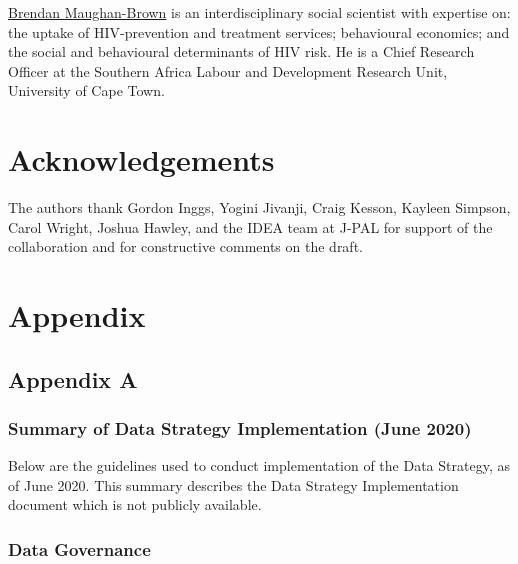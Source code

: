 \href{https://sites.google.com/site/bmaughanbrown/}{Brendan Maughan-Brown} is an interdisciplinary social scientist with expertise on: the uptake of HIV-prevention and treatment services; behavioural economics; and the social and behavioural determinants of HIV risk. He is a Chief Research Officer at the Southern Africa Labour and Development Research Unit, University of Cape Town.

\hypertarget{acknowledgements-3}{%
\section*{Acknowledgements}\label{acknowledgements-3}}

The authors thank Gordon Inggs, Yogini Jivanji, Craig Kesson, Kayleen Simpson, Carol Wright, Joshua Hawley, and the IDEA team at J-PAL for support of the collaboration and for constructive comments on the draft.

\putbib

\FloatBarrier\newpage

\hypertarget{appendix-6}{%
\section*{Appendix}\label{appendix-6}}

\hypertarget{appendix-a-2}{%
\subsection*{Appendix A}\label{appendix-a-2}}

\hypertarget{summary-of-data-strategy-implementation-june-2020}{%
\subsubsection*{Summary of Data Strategy Implementation (June 2020)}\label{summary-of-data-strategy-implementation-june-2020}}

Below are the guidelines used to conduct implementation of the Data Strategy, as of June 2020. This summary describes the Data Strategy Implementation document which is not publicly available.

\hypertarget{data-governance}{%
\subsubsection*{Data Governance}\label{data-governance}}

